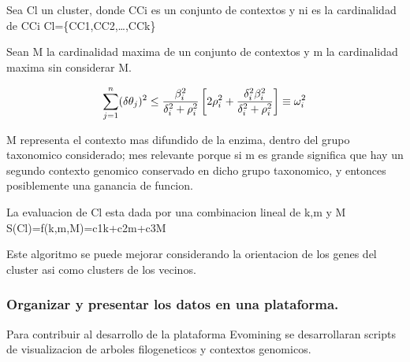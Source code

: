 \documentclass[12pt,twoside]{reedthesis}
\begin{document}
  Sea Cl un cluster, donde CCi es un conjunto de contextos y ni es la
  cardinalidad de CCi Cl=\{CC1,CC2,\ldots{},CCk\}
  
  Sean M la cardinalidad maxima de un conjunto de contextos y m la
  cardinalidad maxima sin considerar M.
  
  \begin{Shaded}
  \begin{Highlighting}[]
  \end{Highlighting}
  \end{Shaded}
  
  \[\sum_{j=1}^n (\delta\theta_j)^2 \leq {{\beta_i^2}\over{\delta_i^2 + \rho_i^2}}
  \left[ 2\rho_i^2 + {\delta_i^2\beta_i^2\over{\delta_i^2 + \rho_i^2}} \right] \equiv \omega_i^2
  \]
  
  M representa el contexto mas difundido de la enzima, dentro del grupo
  taxonomico considerado; mes relevante porque si m es grande significa
  que hay un segundo contexto genomico conservado en dicho grupo
  taxonomico, y entonces posiblemente una ganancia de funcion.
  
  La evaluacion de Cl esta dada por una combinacion lineal de k,m y M\\
  S(Cl)=f(k,m,M)=c1k+c2m+c3M
  
  Este algoritmo se puede mejorar considerando la orientacion de los genes
  del cluster asi como clusters de los vecinos.
  
  \subsubsection{Organizar y presentar los datos en una
  plataforma.}\label{organizar-y-presentar-los-datos-en-una-plataforma.}
  
  Para contribuir al desarrollo de la plataforma Evomining se
  desarrollaran scripts de visualizacion de arboles filogeneticos y
  contextos genomicos.
  
\end{document}
